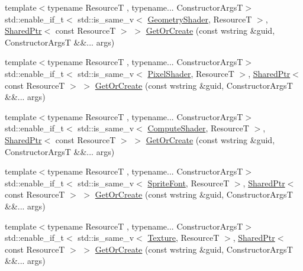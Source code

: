 \begin{DoxyCompactItemize}
\item 
{\footnotesize template$<$typename ResourceT , typename... Constructor\+ArgsT$>$ }\\std\+::enable\+\_\+if\+\_\+t$<$ std\+::is\+\_\+same\+\_\+v$<$ \hyperlink{namespacemage_a0cf0bb4b74903e78658c96412d5687a6}{Geometry\+Shader}, ResourceT $>$, \hyperlink{namespacemage_a1e01ae66713838a7a67d30e44c67703e}{Shared\+Ptr}$<$ const ResourceT $>$ $>$ \hyperlink{classmage_1_1_resource_manager_a7c3f28879378df020f20af26224c317e}{Get\+Or\+Create} (const wstring \&guid, Constructor\+ArgsT \&\&... args)
\item 
{\footnotesize template$<$typename ResourceT , typename... Constructor\+ArgsT$>$ }\\std\+::enable\+\_\+if\+\_\+t$<$ std\+::is\+\_\+same\+\_\+v$<$ \hyperlink{namespacemage_a27ecaf266420ee7a494d64edc0757129}{Pixel\+Shader}, ResourceT $>$, \hyperlink{namespacemage_a1e01ae66713838a7a67d30e44c67703e}{Shared\+Ptr}$<$ const ResourceT $>$ $>$ \hyperlink{classmage_1_1_resource_manager_adeee211203bf0cc5ba8a7d7a76bcb8d8}{Get\+Or\+Create} (const wstring \&guid, Constructor\+ArgsT \&\&... args)
\item 
{\footnotesize template$<$typename ResourceT , typename... Constructor\+ArgsT$>$ }\\std\+::enable\+\_\+if\+\_\+t$<$ std\+::is\+\_\+same\+\_\+v$<$ \hyperlink{namespacemage_ae040329401484b076f0cd1a7c43d19c9}{Compute\+Shader}, ResourceT $>$, \hyperlink{namespacemage_a1e01ae66713838a7a67d30e44c67703e}{Shared\+Ptr}$<$ const ResourceT $>$ $>$ \hyperlink{classmage_1_1_resource_manager_a57a8396c7a7e9bdabcdcad3ab11664c7}{Get\+Or\+Create} (const wstring \&guid, Constructor\+ArgsT \&\&... args)
\item 
{\footnotesize template$<$typename ResourceT , typename... Constructor\+ArgsT$>$ }\\std\+::enable\+\_\+if\+\_\+t$<$ std\+::is\+\_\+same\+\_\+v$<$ \hyperlink{classmage_1_1_sprite_font}{Sprite\+Font}, ResourceT $>$, \hyperlink{namespacemage_a1e01ae66713838a7a67d30e44c67703e}{Shared\+Ptr}$<$ const ResourceT $>$ $>$ \hyperlink{classmage_1_1_resource_manager_a3806319366158069471e3eb194e1c6e3}{Get\+Or\+Create} (const wstring \&guid, Constructor\+ArgsT \&\&... args)
\item 
{\footnotesize template$<$typename ResourceT , typename... Constructor\+ArgsT$>$ }\\std\+::enable\+\_\+if\+\_\+t$<$ std\+::is\+\_\+same\+\_\+v$<$ \hyperlink{classmage_1_1_texture}{Texture}, ResourceT $>$, \hyperlink{namespacemage_a1e01ae66713838a7a67d30e44c67703e}{Shared\+Ptr}$<$ const ResourceT $>$ $>$ \hyperlink{classmage_1_1_resource_manager_ab77cec96c05df7bf54d71edf59fb1106}{Get\+Or\+Create} (const wstring \&guid, Constructor\+ArgsT \&\&... args)

\end{DoxyCompactItemize}
